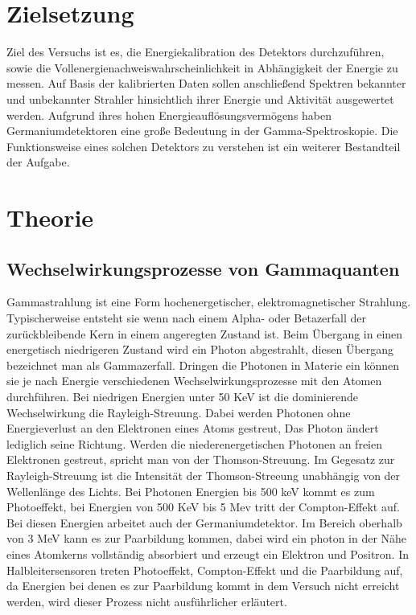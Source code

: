 \section{Zielsetzung}
\label{sec:Zielsetzung}
Ziel des Versuchs ist es, die Energiekalibration des Detektors durchzuführen, sowie 
die Vollenergienachweiswahrscheinlichkeit in Abhängigkeit der Energie zu messen. Auf Basis der kalibrierten Daten sollen 
anschließend Spektren bekannter und unbekannter Strahler hinsichtlich ihrer Energie und Aktivität ausgewertet werden.
Aufgrund ihres hohen Energieauflösungsvermögens haben Germaniumdetektoren eine große Bedeutung in der Gamma-Spektroskopie.
Die Funktionsweise eines solchen Detektors zu verstehen ist ein weiterer Bestandteil der Aufgabe. 

\section{Theorie}
\label{sec:Theorie}
\subsection{Wechselwirkungsprozesse von Gammaquanten}
Gammastrahlung ist eine Form hochenergetischer, elektromagnetischer Strahlung. Typischerweise entsteht sie wenn nach einem 
Alpha- oder Betazerfall der zurückbleibende Kern in einem angeregten Zustand ist. Beim Übergang in einen energetisch niedrigeren 
Zustand wird ein Photon abgestrahlt, diesen Übergang bezeichnet man als Gammazerfall. Dringen die Photonen in Materie ein können sie 
je nach Energie verschiedenen Wechselwirkungsprozesse mit den Atomen durchführen. Bei niedrigen Energien unter 50 KeV ist die
dominierende Wechselwirkung die Rayleigh-Streuung. Dabei werden Photonen ohne Energieverlust an den Elektronen eines Atoms gestreut,
Das Photon ändert lediglich seine Richtung. Werden die niederenergetischen Photonen an freien Elektronen gestreut, spricht man von der 
Thomson-Streuung. Im Gegesatz zur Rayleigh-Streuung ist die Intensität der Thomson-Streeung unabhängig von der Wellenlänge des Lichts.
Bei Photonen Energien bis 500 keV kommt es zum Photoeffekt, bei Energien von 500 KeV bis 5 Mev tritt der Compton-Effekt auf. Bei diesen 
Energien arbeitet auch der Germaniumdetektor. Im Bereich oberhalb von 3 MeV kann es zur 
Paarbildung kommen, dabei wird ein photon in der Nähe eines Atomkerns vollständig absorbiert und erzeugt ein Elektron und Positron.
In Halbleitersensoren treten Photoeffekt, Compton-Effekt und die Paarbildung auf, da Energien bei denen es zur Paarbildung kommt in dem Versuch
nicht erreicht werden, wird dieser Prozess nicht ausführlicher erläutert.
\cite{Gammastrahlung}



